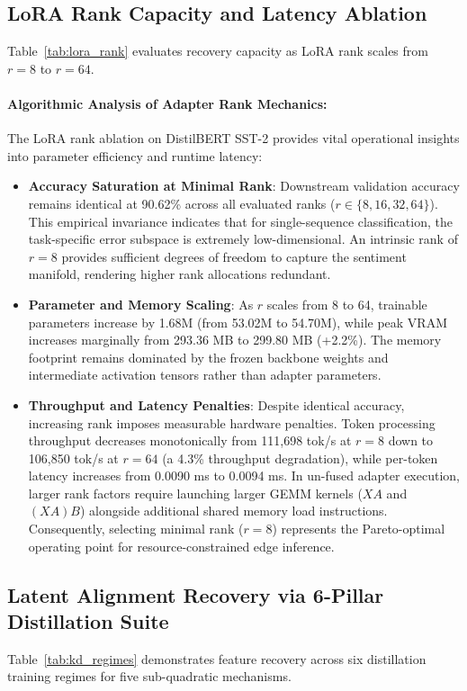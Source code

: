 \documentclass{article}
\begin{document}
\subsection{LoRA Rank Capacity and Latency Ablation}
Table~\ref{tab:lora_rank} evaluates recovery capacity as LoRA rank scales from $r=8$ to $r=64$.



\paragraph{Algorithmic Analysis of Adapter Rank Mechanics:}
The LoRA rank ablation on DistilBERT SST-2 provides vital operational insights into parameter efficiency and runtime latency:
\begin{itemize}
    \item \textbf{Accuracy Saturation at Minimal Rank}: Downstream validation accuracy remains identical at 90.62\% across all evaluated ranks ($r \in \{8, 16, 32, 64\}$). This empirical invariance indicates that for single-sequence classification, the task-specific error subspace is extremely low-dimensional. An intrinsic rank of $r=8$ provides sufficient degrees of freedom to capture the sentiment manifold, rendering higher rank allocations redundant.
    \item \textbf{Parameter and Memory Scaling}: As $r$ scales from 8 to 64, trainable parameters increase by 1.68M (from 53.02M to 54.70M), while peak VRAM increases marginally from 293.36 MB to 299.80 MB (+2.2\%). The memory footprint remains dominated by the frozen backbone weights and intermediate activation tensors rather than adapter parameters.
    \item \textbf{Throughput and Latency Penalties}: Despite identical accuracy, increasing rank imposes measurable hardware penalties. Token processing throughput decreases monotonically from 111,698 tok/s at $r=8$ down to 106,850 tok/s at $r=64$ (a 4.3\% throughput degradation), while per-token latency increases from 0.0090 ms to 0.0094 ms. In un-fused adapter execution, larger rank factors require launching larger GEMM kernels ($X A$ and $(X A) B$) alongside additional shared memory load instructions. Consequently, selecting minimal rank ($r=8$) represents the Pareto-optimal operating point for resource-constrained edge inference.
\end{itemize}

\subsection{Latent Alignment Recovery via 6-Pillar Distillation Suite}
Table~\ref{tab:kd_regimes} demonstrates feature recovery across six distillation training regimes for five sub-quadratic mechanisms.
\end{document}
